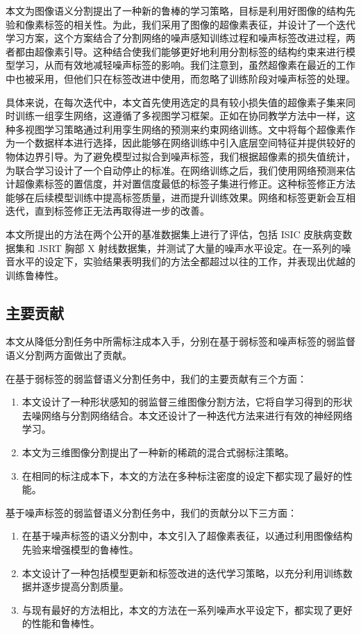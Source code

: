 本文为图像语义分割提出了一种新的鲁棒的学习策略，目标是利用好图像的结构先验和像素标签的相关性。为此，我们采用了图像的超像素表征，并设计了一个迭代学习方案，这个方案结合了分割网络的噪声感知训练过程和噪声标签改进过程，两者都由超像素引导。这种结合使我们能够更好地利用分割标签的结构约束来进行模型学习，从而有效地减轻噪声标签的影响。我们注意到，虽然超像素在最近的工作中也被采用\citep{li2019supervised}，但他们只在标签改进中使用，而忽略了训练阶段对噪声标签的处理。

具体来说，在每次迭代中，本文首先使用选定的具有较小损失值的超像素子集来同时训练一组孪生网络，这遵循了多视图学习框架\citep{Han2018CoteachingRT,Wei2020CombatingNL}。正如在协同教学方法中一样，这种多视图学习策略通过利用孪生网络的预测来约束网络训练。文中将每个超像素作为一个数据样本进行选择，因此能够在网络训练中引入底层空间特征并提供较好的物体边界引导。为了避免模型过拟合到噪声标签，我们根据超像素的损失值统计，为联合学习设计了一个自动停止的标准。在网络训练之后，我们使用网络预测来估计超像素标签的置信度，并对置信度最低的标签子集进行修正。这种标签修正方法能够在后续模型训练中提高标签质量，进而提升训练效果。网络和标签更新会互相迭代，直到标签修正无法再取得进一步的改善。

本文所提出的方法在两个公开的基准数据集上进行了评估，包括 ISIC 皮肤病变数据集\citep{Gutman2018SkinLA}和 JSRT 胸部 X 射线数据集\citep{Ginneken2006SegmentationOA,Shiraishi2000DevelopmentOA}，并测试了大量的噪声水平设定。在一系列的噪音水平的设定下，实验结果表明我们的方法全都超过以往的工作，并表现出优越的训练鲁棒性。

\subsection{主要贡献}
本文从降低分割任务中所需标注成本入手，分别在基于弱标签和噪声标签的弱监督语义分割两方面做出了贡献。

在基于弱标签的弱监督语义分割任务中，我们的主要贡献有三个方面：
\begin{enumerate}
\item 本文设计了一种形状感知的弱监督三维图像分割方法，它将自学习得到的形状去噪网络与分割网络结合。本文还设计了一种迭代方法来进行有效的神经网络学习。
\item 本文为三维图像分割提出了一种新的稀疏的混合式弱标注策略。
\item 在相同的标注成本下，本文的方法在多种标注密度的设定下都实现了最好的性能。
\end{enumerate}


基于噪声标签的弱监督语义分割任务中，我们的贡献分以下三方面：
\begin{enumerate}
    \item 在基于噪声标签的语义分割中，本文引入了超像素表征，以通过利用图像结构先验来增强模型的鲁棒性。
    \item 本文设计了一种包括模型更新和标签改进的迭代学习策略，以充分利用训练数据并逐步提高分割质量。
    \item 与现有最好的方法相比，本文的方法在一系列噪声水平设定下，都实现了更好的性能和鲁棒性。
\end{enumerate}

